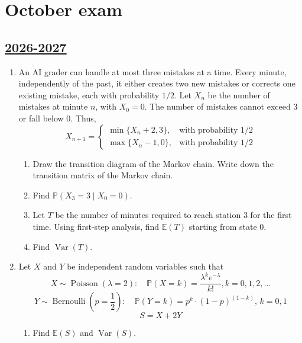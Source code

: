 


\newpage
\thispagestyle{empty}
\section{October exam}

\subsection[2026-2027]{\hyperref[sec:sol_kr_01_2026_2027]{2026-2027}}
\label{sec:kr_01_2026_2027}

\begin{enumerate}
    \item 
An AI grader can handle at most three mistakes at a time.
Every minute, independently of the past, it either
creates two new mistakes or corrects one existing mistake,
each with probability $1/2$. Let $X_n$ be the number of mistakes at minute $n$, with $X_0=0$. The number of mistakes cannot exceed
3 or fall below 0. Thus,
\[
X_{n+1}=
\begin{cases}
\min\{X_n+2,3\}, &\text{with probability }1/2\\
\max\{X_n-1,0\}, &\text{with probability }1/2
\end{cases}
\]
\begin{enumerate}
    \item[(a)] [2] Draw the transition diagram
    of the Markov chain. Write down the transition matrix of the Markov chain.

    \item[(b)] [2] Find
    $\mathbb{P}(X_3=3\mid X_0=0)$.     

    \item[(c)] [3] Let $T$ be the number of minutes
    required to reach station 3 for the first time.
    Using first-step analysis, find $\mathbb{E}(T)$
    starting from state 0.

    \item[(d)] [3] Find $\operatorname{Var}(T)$.
\end{enumerate}

\item
Let $X$ and $Y$ be independent random variables
such that 
\[
X\sim \operatorname{Poisson}(\lambda = 2): \quad \mathbb{P}(X=k)=\frac{\lambda^k e^{-\lambda}}{k!}, k=0,1,2,\ldots
\]
\[
Y \sim \operatorname{Bernoulli}\left(p = \frac12\right): \quad  \mathbb{P}(Y=k)=p^k \cdot {(1-p)}^{(1-k)}, \, k = 0,1
\]
$$
S = X + 2Y
$$
\begin{enumerate}
    \item[(a)] [2] Find $\mathbb{E}(S)$ and $\operatorname{Var}(S)$.
    

\end{enumerate}
\end{enumerate}
